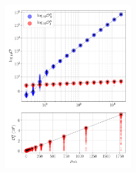 



\begin{figure}[phtb]
\begin{center}
\includegraphics[width=0.5\textwidth]{./figures/appendix3/approx_odds}
\caption{ \protect}
\end{center}
\end{figure}



{}


